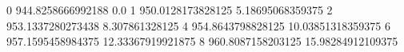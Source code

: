 0 944.8258666992188 0.0
1 950.0128173828125 5.18695068359375
2 953.1337280273438 8.307861328125
4 954.8643798828125 10.03851318359375
6 957.1595458984375 12.33367919921875
8 960.8087158203125 15.98284912109375
